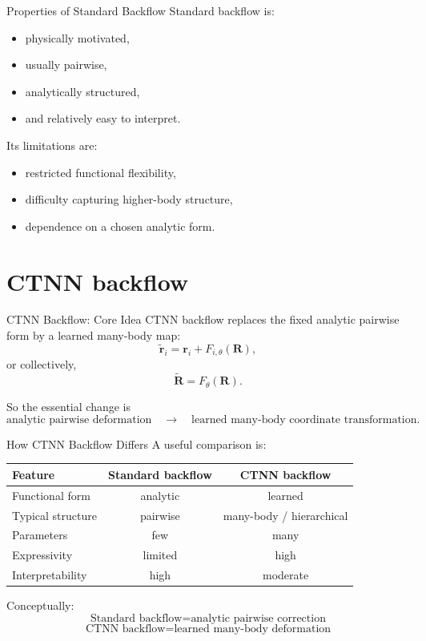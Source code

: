 \documentclass[aspectratio=169]{beamer}
\begin{document}
\begin{frame}{Properties of Standard Backflow}
Standard backflow is:
\begin{itemize}
    \item physically motivated,
    \item usually pairwise,
    \item analytically structured,
    \item and relatively easy to interpret.
\end{itemize}

Its limitations are:
\begin{itemize}
    \item restricted functional flexibility,
    \item difficulty capturing higher-body structure,
    \item dependence on a chosen analytic form.
\end{itemize}
\end{frame}

\section{CTNN backflow}

\begin{frame}{CTNN Backflow: Core Idea}
CTNN backflow replaces the fixed analytic pairwise form by a learned many-body map:
\[
\tilde{\mathbf{r}}_i = \mathbf{r}_i + F_{i,\theta}(\mathbf{R}),
\]
or collectively,
\[
\tilde{\mathbf{R}} = F_\theta(\mathbf{R}).
\]

So the essential change is
\[
\text{analytic pairwise deformation}
\quad\longrightarrow\quad
\text{learned many-body coordinate transformation}.
\]
\end{frame}

\begin{frame}{How CTNN Backflow Differs}
A useful comparison is:

\begin{center}
\begin{tabular}{lcc}
\hline
Feature & Standard backflow & CTNN backflow \\
\hline
Functional form & analytic & learned \\
Typical structure & pairwise & many-body / hierarchical \\
Parameters & few & many \\
Expressivity & limited & high \\
Interpretability & high & moderate \\
\hline
\end{tabular}
\end{center}

Conceptually:
\[
\boxed{\text{Standard backflow}=\text{analytic pairwise correction}}
\]
\[
\boxed{\text{CTNN backflow}=\text{learned many-body deformation}}
\]
\end{frame}
\end{document}
